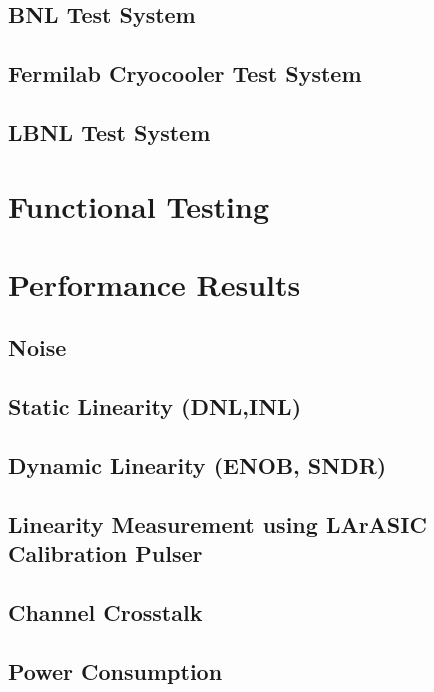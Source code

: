 \documentclass[10pt]{article}
\begin{document}
\subsection{BNL Test System }

\subsection{Fermilab Cryocooler Test System }

\subsection{LBNL Test System }


\newpage
\section{Functional Testing }


	
\newpage
\section{Performance Results}


\subsection{Noise}


\clearpage
\newpage
\subsection{Static Linearity (DNL,INL)}

\subsection{Dynamic Linearity (ENOB, SNDR)}

\clearpage
\newpage
\subsection{Linearity Measurement using LArASIC Calibration Pulser}

\clearpage
\newpage
\subsection{Channel Crosstalk }

\clearpage
\newpage
\subsection{Power Consumption }

\end{document}
